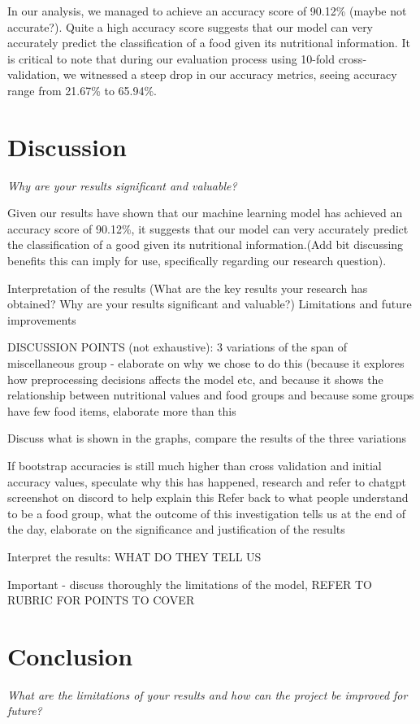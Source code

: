 \documentclass[11pt]{article}
\begin{document}
In our analysis, we managed to achieve an accuracy score of 90.12\% (maybe not accurate?). Quite a high accuracy score suggests that our model can very accurately predict the classification of a food given its nutritional information. It is critical to note that during our evaluation process using 10-fold cross-validation, we witnessed a steep drop in our accuracy metrics, seeing accuracy range from 21.67\% to 65.94\%.
\section{Discussion}
\emph{Why are your results significant and valuable?}

Given our results have shown that our machine learning model has achieved an accuracy score of 90.12\%, it suggests that our model can very accurately predict the classification of a good given its nutritional information.(Add bit discussing benefits this can imply for use, specifically regarding our research question).

Interpretation of the results (What are the key results your research has obtained? Why are your results significant and valuable?)
Limitations and future improvements

DISCUSSION POINTS (not exhaustive):
3 variations of the span of miscellaneous group - elaborate on why we chose to do this (because it explores how preprocessing decisions affects the model etc, and because it shows the relationship between nutritional values and food groups and because some groups have few food items, elaborate more than this

Discuss what is shown in the graphs, compare the results of the three variations

If bootstrap accuracies is still much higher than cross validation and initial accuracy values, speculate why this has happened, research and refer to chatgpt screenshot on discord to help explain this
Refer back to what people understand to be a food group, what the outcome of this investigation tells us at the end of the day, elaborate on the significance and justification of the results

Interpret the results: WHAT DO THEY TELL US

Important - discuss thoroughly the limitations of the model, REFER TO RUBRIC FOR POINTS TO COVER


\section{Conclusion}
\emph{What are the limitations of your results and how can the project be improved for future?}
\end{document}
